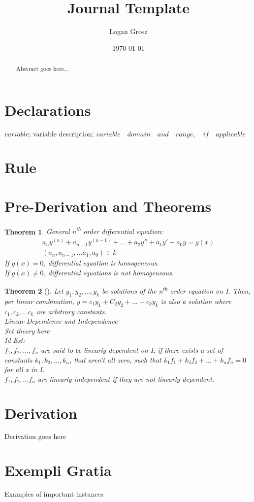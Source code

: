 \documentclass{article}
\newtheorem{Thm}{Theorem}
\begin{document}
	
\author{Logan Grosz}
\title{Journal Template}
\date{\today}

\maketitle

\begin{abstract}
	Abstract goes here...
\end{abstract}

\section{Declarations}

$variable$; variable description; $variable\quad domain\quad and\quad range,\quad if\quad applicable$

\section{Rule}
\section{Pre-Derivation and Theorems}
	\begin{Thm}
		General n\textsuperscript{th} order differential equation:\\
		\begin{gather*}
			a_ny^{(n)}+a_{n-1}y^{(n-1)}+\dots+a_2y''+a_1y'+a_0y=g(x)\\
			(a_n,a_{n-1},\dots a_1,a_0)\in k
		\end{gather*}
	If \(g(x)=0\), differential equation is homogeneous.\\
	If \(g(x)\neq0\), differential equations is not homogeneous.
	\end{Thm}

	\begin{Thm}[]
		Let $y_1,y_2,\dots,y_k$ be solutions of the n\textsuperscript{th} order equation on I. Then, per linear combination, $y=c_1y_1+C_2y_2+\dots+c_ky_k$ is also a solution where $c_1,c_2,...c_k$ are arbitrary constants.\\
		
		\noindent Linear Dependence and Independence\\
		
		\noindent Set theory here\\
		
		\noindent Id Est:\\
		\noindent $f_1,f_2,\dots,f_n$ are said to be linearly dependent on I, if there exists a set of constants $k_1,k_2,\dots,k_n$, that aren't all zero, such that $k_1f_1+k_2f_2+\dots+k_nf_n=0$ for all x in I.\\
		
		\noindent$f_1,f_2,...f_n$ are linearly independent if they are not linearly dependent.
	\end{Thm}
\section{Derivation}

Derivation goes here

\section{Exempli Gratia}

Examples of important instances
\end{document}
